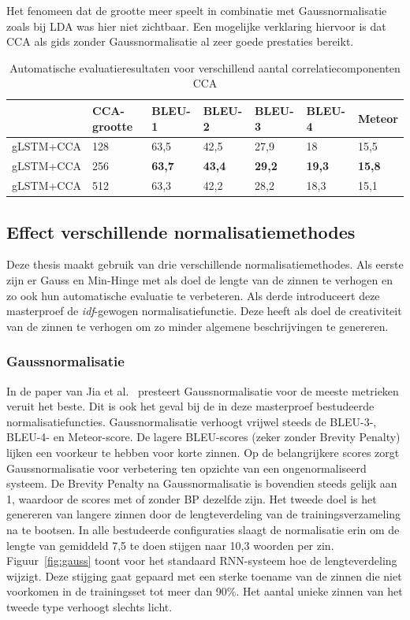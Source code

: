 Het fenomeen dat de grootte meer speelt in combinatie met Gaussnormalisatie zoals bij LDA was hier niet zichtbaar. Een mogelijke verklaring hiervoor is dat CCA als gids zonder Gaussnormalisatie al zeer goede prestaties bereikt.
\begin{table}
	\centering
	\begin{tabular}{lllllll}
		~              & CCA-grootte     & BLEU-1 & BLEU-2 & BLEU-3 & BLEU-4 & Meteor \\ \hline
		gLSTM+CCA & 128        & 63,5   & 42,5 			& 27,9   & 18   & 15,5  \\
		gLSTM+CCA & 256        & \textbf{63,7}   & \textbf{43,4}   & \textbf{29,2}   & \textbf{19,3}   & \textbf{15,8}  \\
		gLSTM+CCA & 512        & 63,3   & 42,2   & 28,2   & 18,3 & 15,1  \\ \hline
	
	\end{tabular}

	\caption{Automatische evaluatieresultaten voor verschillend aantal correlatiecomponenten CCA}
		\label{table:results_cca}
\end{table}



\subsection{Effect verschillende normalisatiemethodes}
Deze thesis maakt gebruik van drie verschillende normalisatiemethodes. Als eerste zijn er Gauss en Min-Hinge met als doel de lengte van de zinnen te verhogen en zo ook hun automatische evaluatie te verbeteren. Als derde introduceert deze masterproef de \emph{idf}-gewogen normalisatiefunctie. Deze heeft als doel de creativiteit van de zinnen te verhogen om zo minder algemene beschrijvingen te genereren.

\subsubsection{Gaussnormalisatie}
In de paper van Jia et al.~\cite{Fernando2015} presteert Gaussnormalisatie voor de meeste metrieken veruit het beste. 
Dit is ook het geval bij de in deze masterproef bestudeerde normalisatiefuncties. Gaussnormalisatie verhoogt vrijwel steeds de BLEU-3-, BLEU-4- en Meteor-score. De lagere BLEU-scores (zeker zonder Brevity Penalty) lijken een voorkeur te hebben voor korte zinnen. Op de belangrijkere scores zorgt Gaussnormalisatie voor verbetering ten opzichte van een ongenormaliseerd systeem. De Brevity Penalty na Gaussnormalisatie is bovendien steeds gelijk aan 1, waardoor de scores met of zonder BP dezelfde zijn.
Het tweede doel is het genereren van langere zinnen door de lengteverdeling van de trainingsverzameling na te bootsen.
In alle bestudeerde configuraties slaagt de normalisatie erin om de lengte van gemiddeld 7,5 te doen stijgen naar 10,3 woorden per zin. Figuur~\ref{fig:gauss} toont voor het standaard RNN-systeem hoe de lengteverdeling wijzigt. Deze stijging gaat gepaard met een sterke toename van de zinnen die niet voorkomen in de trainingsset tot meer dan 90\%. Het aantal unieke zinnen van het tweede type verhoogt slechts licht. 

